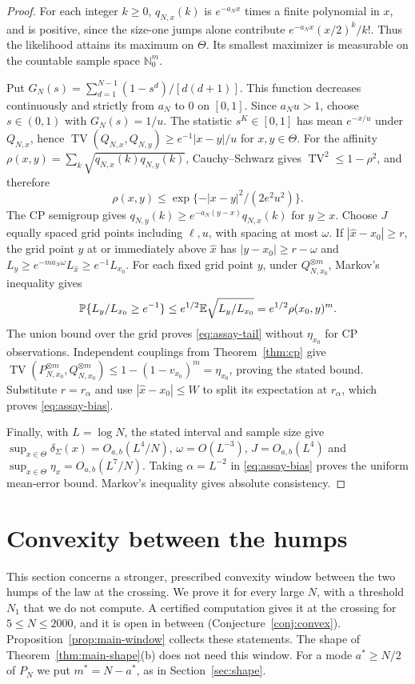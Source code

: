 \begin{proof}
For each integer $k\ge0$, $q_{N,x}(k)$ is $e^{-a_Nx}$ times a finite
polynomial in $x$, and is positive, since the size-one jumps alone contribute
$e^{-a_Nx}(x/2)^k/k!$. Thus the likelihood attains its maximum on
$\Theta$. Its smallest maximizer is measurable on the countable sample
space $\mathbb N_0^m$.

Put $G_N(s)=\sum_{d=1}^{N-1}(1-s^d)/[d(d+1)]$.
This function decreases continuously and strictly from $a_N$ to $0$ on
$[0,1]$. Since $a_Nu>1$, choose $s\in(0,1)$ with $G_N(s)=1/u$.
The statistic $s^K\in[0,1]$ has mean $e^{-x/u}$ under $Q_{N,x}$, hence
$\operatorname{TV}(Q_{N,x},Q_{N,y})\ge e^{-1}|x-y|/u$ for $x,y\in\Theta$.
For the affinity $\rho(x,y)=\sum_k\sqrt{q_{N,x}(k)q_{N,y}(k)}$,
Cauchy--Schwarz gives $\operatorname{TV}^2\le1-\rho^2$, and therefore
\[
 \rho(x,y)\le\exp\{-|x-y|^2/(2e^2u^2)\}.
\]
The CP semigroup gives
$q_{N,y}(k)\ge e^{-a_N(y-x)}q_{N,x}(k)$ for $y\ge x$.
Choose $J$ equally spaced grid points including $\ell,u$, with spacing at
most $\omega$. If $|\widehat x-x_0|\ge r$, the grid point $y$ at or
immediately above $\widehat x$ has $|y-x_0|\ge r-\omega$ and
$L_y\ge e^{-ma_N\omega}L_{\widehat x}\ge e^{-1}L_{x_0}$.
For each fixed grid point $y$, under $Q_{N,x_0}^{\otimes m}$, Markov's inequality gives
\[
 \mathbb{P}\{L_y/L_{x_0}\ge e^{-1}\}
 \le e^{1/2}\mathbb{E}\sqrt{L_y/L_{x_0}}
 =e^{1/2}\rho(x_0,y)^m.
\]
The union bound over the grid proves \eqref{eq:assay-tail} without
$\eta_{x_0}$ for CP observations. Independent couplings from
Theorem~\ref{thm:cp} give
$\operatorname{TV}(P_{N,x_0}^{\otimes m},Q_{N,x_0}^{\otimes m})
\le1-(1-v_{x_0})^m=\eta_{x_0}$, proving the stated bound.
Substitute $r=r_\alpha$ and use $|\widehat x-x_0|\le W$ to split its
expectation at $r_\alpha$, which proves \eqref{eq:assay-bias}.

Finally, with $L=\log N$, the stated interval and sample size give
$\sup_{x\in\Theta}\delta_\Sigma(x)=O_{a,b}(L^4/N)$,
$\omega=O(L^{-3})$, $J=O_{a,b}(L^4)$ and
$\sup_{x\in\Theta}\eta_x=O_{a,b}(L^7/N)$.
Taking $\alpha=L^{-2}$ in \eqref{eq:assay-bias} proves the uniform
mean-error bound. Markov's inequality gives absolute consistency.
\end{proof}

\section{Convexity between the humps}\label{or:window}

This section concerns a stronger, prescribed convexity window between the
two humps of the law at the crossing. We prove it for every large $N$,
with a threshold $N_1$ that we do not compute. A certified computation
gives it at the crossing for $5\le N\le2000$, and it is open in between
(Conjecture~\ref{conj:convex}). Proposition~\ref{prop:main-window} collects
these statements. The shape of Theorem~\ref{thm:main-shape}(b) does not
need this window. For a mode $a^*\ge N/2$ of $P_N$ we put $m^*=N-a^*$, as
in Section~\ref{sec:shape}.

